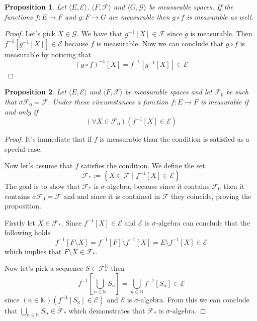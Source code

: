 \documentclass[a4paper]{amsart}
\newtheorem{prop}{Proposition}
\newcommand{\pair}[2]{\langle #1, #2\rangle}
\newcommand{\NN}{\mathbb{N}}
\begin{document}
\begin{prop}
    Let $\pair{E}{\mathcal{E}}$, $\pair{F}{\mathcal{F}}$ and
    $\pair{G}{\mathcal{G}}$ be measurable spaces. If the functions $f : E \longrightarrow F$ and
    $g: F \longrightarrow G$ are measurable then $g \circ f$ is 
    measurable as well.
\end{prop}

\begin{proof}
    Let's pick $X \in \mathcal{G}$. We have that $ g^{-1}[X] \in \mathcal{F}$ since $g$ is measurable. Then $f^{-1}[g^{-1}[X] ] \in \mathcal{E}$ 
    because $f$ is measurable. Now we 
    can conclude that $g \circ f$ is measurable by noticing 
    that
    $$
    \left(g \circ f\right)^{-1}[X] = f^{-1}[g^{-1}[X] ] \in \mathcal{E}
    $$
\end{proof}

\begin{prop}
    Let  $\pair{E}{\mathcal{E}}$ and $\pair{F}{\mathcal{F}}$ be 
    measurable spaces and let $\mathcal{F}_0$ be such that
    $\sigma\mathcal{F}_0 = \mathcal{F}$. Under these 
    circumstances a function $f : E \longrightarrow F$ is
    measurable if and only if 
    $$
    \left( \forall X \in \mathcal{F}_0\right)
    \left( f^{-1}[X] \in \mathcal{E}\right)
    $$
\end{prop}

\begin{proof}
    It's immediate that if $f$ is measurable than the condition 
    is satisfied as a special case.
    
    Now let's assume that $f$ satisfies the condition. We define the set
    $$
    \mathcal{F}_* := \left\{ X \in \mathcal{F} \mid  f^{-1}[X] \in \mathcal{E} \right\}
    $$
    The goal is to show that $\mathcal{F}_*$ is
    $\sigma$-algebra, because since it contains $\mathcal{F}_0$ 
    then it contains $\sigma\mathcal{F}_0 = \mathcal{F}$ and 
    and since it is contained in $\mathcal{F}$ they coincide, 
    proving the proposition.
    
    Firstly let $X \in \mathcal{F}_*$. Since $f^{-1}[X] \in \mathcal{E}$
    and $\mathcal{E}$ is $\sigma$-algebra can conclude  that the following holds
    $$
    f^{-1}[F\setminus X] = f^{-1}[F] \setminus f^{-1}[X] = E \setminus f^{-1}[X] \in \mathcal{E}
    $$
    which implies that $F\setminus X\in \mathcal{F}_*$.
    
    Now let's pick a sequence $S \in \mathcal{F}_*^\NN$ then
    $$
    f^{-1}\left[ \bigcup\limits_{n \in \NN} S_n \right] = 
    \bigcup\limits_{n \in \NN} f^{-1}[S_n] \in \mathcal{E}
    $$
    since $\left(n \in \NN \right) \left(f^{-1}[S_n] \in \mathcal{E}\right)$ and 
    $\mathcal{E}$ is $\sigma$-algebra. From this we can conclude
    that $\bigcup\limits_{n \in \NN} S_n \in \mathcal{F}_*$
    which demonstrates that $\mathcal{F}_*$ is $\sigma$-algebra.
\end{proof}
\end{document}
